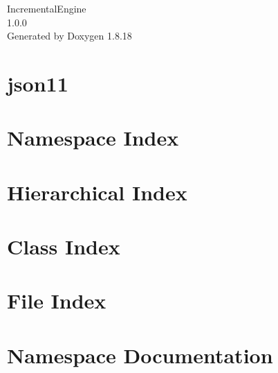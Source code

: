 \let\mypdfximage\pdfximage\def\pdfximage{\immediate\mypdfximage}\documentclass[twoside]{book}
\newcommand{\+}{\discretionary{\mbox{\scriptsize$\hookleftarrow$}}{}{}}
\newcommand{\clearemptydoublepage}{%
  \newpage{\pagestyle{empty}\cleardoublepage}%
}
\begin{document}
\hypersetup{pageanchor=false,
             bookmarksnumbered=true,
             pdfencoding=unicode
            }
\begin{titlepage}
\vspace*{7cm}
\begin{center}%
{\Large Incremental\+Engine \\[1ex]\large 1.\+0.\+0 }\\
\vspace*{1cm}
{\large Generated by Doxygen 1.8.18}\\
\end{center}
\end{titlepage}
\clearemptydoublepage
{}
\tableofcontents
\clearemptydoublepage
{}
\hypersetup{pageanchor=true}

\chapter{json11}
\label{md__d_1__user__pol__tecnocampus_4t__curs__t_f_g__incremental_engine__incremental_engine__incremed6e4b1f4b76d6602982d007e3e4ecbff}

\chapter{Namespace Index}

\chapter{Hierarchical Index}

\chapter{Class Index}

\chapter{File Index}

\chapter{Namespace Documentation}



\end{document}
